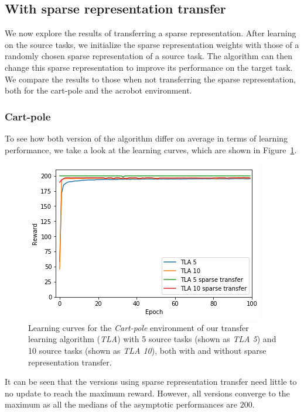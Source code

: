 \subsection{With sparse representation transfer} %
\label{sub:with_sparse_representation_transfer}
We now explore the results of transferring a sparse representation. After learning on the source tasks, we initialize the sparse representation weights with those of a randomly chosen sparse representation of a source task. The algorithm can then change this sparse representation to improve its performance on the target task. We compare the results to those when not transferring the sparse representation, both for the cart-pole and the acrobot environment.
\subsubsection{Cart-pole} %
\label{ssub:with_sparse_representation_transfer:cartpole}
To see how both version of the algorithm differ on average in terms of learning performance, we take a look at the learning curves, which are shown in Figure~\ref{fig:CartPole:st:reward_target_without-with}.
\begin{figure}[htb]
    \centering
    \includegraphics[width=.8\linewidth]{images/results/CartPole/sparse_transfer/reward_target_without_with.png}
    \caption[Learning curves for the \textit{cart-pole} environment of \textit{TLA} with and without sparse representation transfer]{Learning curves for the \emph{Cart-pole} environment of our transfer learning algorithm (\textit{TLA}) with 5 source tasks (shown as \textit{TLA 5}) and 10 source tasks (shown as \textit{TLA 10}), both with and without sparse representation transfer.}
    \label{fig:CartPole:st:reward_target_without-with}
\end{figure}
It can be seen that the versions using sparse representation transfer need little to no update to reach the maximum reward. However, all versions converge to the maximum as all the medians of the asymptotic performances are $200$.

